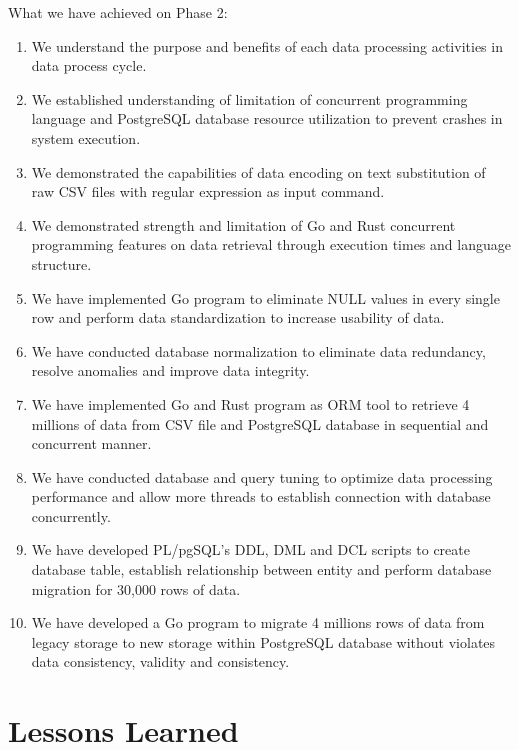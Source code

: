 What we have achieved on Phase 2:
\begin{enumerate}[topsep=0pt,itemsep=-1ex,partopsep=1ex,parsep=1.5ex]
	\item We understand the purpose and benefits of each data processing activities in data process cycle. 
	\item We established understanding of limitation of concurrent programming language and PostgreSQL database resource utilization to prevent crashes in system execution. 
	\item We demonstrated the capabilities of data encoding on text substitution of raw CSV files with regular expression as input command.  
	\item We demonstrated strength and limitation of Go and Rust concurrent programming features on data retrieval through execution times and language structure. 
	\item We have implemented Go program to eliminate NULL values in every single row and perform data standardization to increase usability of data. 
	\item We have conducted database normalization to eliminate data redundancy, resolve anomalies and improve data integrity. 
	\item We have implemented Go and Rust program as ORM tool to retrieve 4 millions of data from CSV file and PostgreSQL database in sequential and concurrent manner. 
	\item We have conducted database and query tuning to optimize data processing performance and allow more threads to establish connection with database concurrently. 
	\item We have developed PL/pgSQL's DDL, DML and DCL scripts to create database table, establish relationship between entity and perform database migration for 30,000 rows of data. 
	\item We have developed a Go program to migrate 4 millions rows of data from legacy storage to new storage within PostgreSQL database without violates data consistency, validity and consistency. 
	
\end{enumerate}


\section{Lessons Learned}

